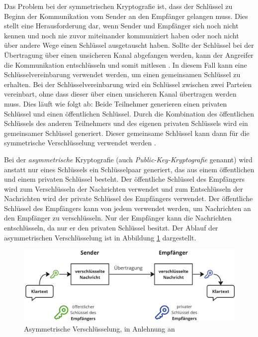 \noindent Das Problem bei der symmetrischen Kryptografie ist, dass der Schlüssel zu Beginn der Kommunikation vom Sender an den Empfänger gelangen muss. Dies stellt eine Herausforderung dar, wenn Sender und Empfänger sich noch nicht kennen und noch nie zuvor miteinander kommuniziert haben oder noch nicht über andere Wege einen Schlüssel ausgetauscht haben. Sollte der Schlüssel bei der Übertragung über einen unsicheren Kanal abgefangen werden, kann der Angreifer die Kommunikation entschlüsseln und somit mitlesen \Parencites[S. 644]{DiffieHellman_NewDirectionsInCryptography}[S. 5-8]{Wong_KryptoPraxis}. In diesem Fall kann eine Schlüsselvereinbarung verwendet werden, um einen gemeinsamen Schlüssel zu erhalten. Bei der Schlüsselvereinbarung wird ein Schlüssel zwischen zwei Parteien vereinbart, ohne dass dieser über einen unsicheren Kanal übertragen werden muss. Dies läuft wie folgt ab: Beide Teilnehmer generieren einen privaten Schlüssel und einen öffentlichen Schlüssel. Durch die Kombination des öffentlichen Schlüssels des anderen Teilnehmers und des eigenen privaten Schlüssels wird ein gemeinsamer Schlüssel generiert. Dieser gemeinsame Schlüssel kann dann für die symmetrische Verschlüsselung verwendet werden \Parencite[S. 11-12]{Wong_KryptoPraxis}. 


Bei der \textit{asymmetrische} Kryptografie (auch \textit{Public-Key-Kryptografie} genannt) wird anstatt nur eines Schlüssels ein Schlüsselpaar generiert, das aus einem öffentlichen und einem privaten Schlüssel besteht. Der öffentliche Schlüssel des Empfängers wird zum Verschlüsseln der Nachrichten verwendet und zum Entschlüsseln der Nachrichten wird der private Schlüssel des Empfängers verwendet. Der öffentliche Schlüssel des Empfängers kann von jedem verwendet werden, um Nachrichten an den Empfänger zu verschlüsseln. Nur der Empfänger kann die Nachrichten entschlüsseln, da nur er den privaten Schlüssel besitzt. Der Ablauf der asymmetrischen Verschlüsselung ist in Abbildung \ref{fig:asymmetrische_verschluesselung} dargestellt.


\begin{center}
    \begin{figure}[H]
        \centering
        \includegraphics[width=1\linewidth]{images/asymmetric_encryption.png}
        \caption{Asymmetrische Verschlüsselung, in Anlehnung an \cite{ElektronikKompendium_asymmetrischeVerschluesselung}}
        \label{fig:asymmetrische_verschluesselung}
    \end{figure}
\end{center}

